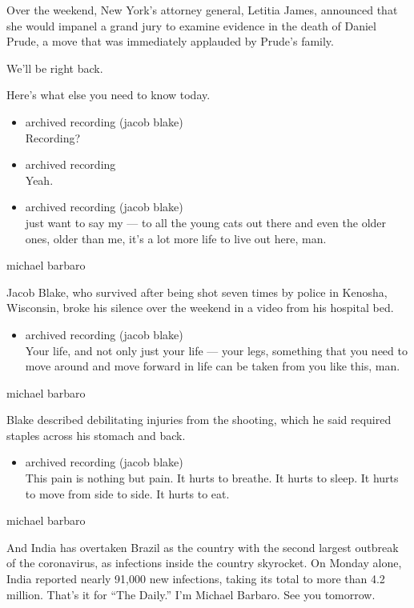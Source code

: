 Over the weekend, New York's attorney general, Letitia James, announced
that she would impanel a grand jury to examine evidence in the death of
Daniel Prude, a move that was immediately applauded by Prude's family.

We'll be right back.

Here's what else you need to know today.

\begin{itemize}
\item
  archived recording (jacob blake)\\
  Recording?
\item
  archived recording\\
  Yeah.
\item
  archived recording (jacob blake)\\
  just want to say my --- to all the young cats out there and even the
  older ones, older than me, it's a lot more life to live out here, man.
\end{itemize}

michael barbaro

Jacob Blake, who survived after being shot seven times by police in
Kenosha, Wisconsin, broke his silence over the weekend in a video from
his hospital bed.

\begin{itemize}
\tightlist
\item
  archived recording (jacob blake)\\
  Your life, and not only just your life --- your legs, something that
  you need to move around and move forward in life can be taken from you
  like this, man.
\end{itemize}

michael barbaro

Blake described debilitating injuries from the shooting, which he said
required staples across his stomach and back.

\begin{itemize}
\tightlist
\item
  archived recording (jacob blake)\\
  This pain is nothing but pain. It hurts to breathe. It hurts to sleep.
  It hurts to move from side to side. It hurts to eat.
\end{itemize}

michael barbaro

And India has overtaken Brazil as the country with the second largest
outbreak of the coronavirus, as infections inside the country skyrocket.
On Monday alone, India reported nearly 91,000 new infections, taking its
total to more than 4.2 million. That's it for ``The Daily.'' I'm Michael
Barbaro. See you tomorrow.

